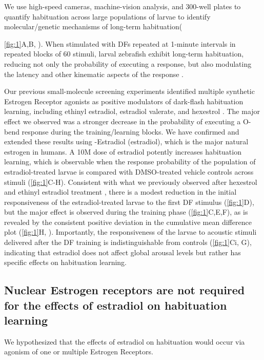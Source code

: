 \documentclass[9pt,lineno]{RandlettLab_elife}
\begin{document}
We use high-speed cameras, machine-vision analysis, and 300-well plates to quantify habituation across large populations of larvae to identify molecular/genetic mechanisms of long-term habituation({\autoref{fig:1}A,B, \citealp{Randlett2019-fj,Lamire2023-he}). 
When stimulated with DFs repeated at 1-minute intervals in repeated blocks of 60 stimuli, larval zebrafish exhibit long-term habituation, reducing not only the probability of executing a response, but also modulating the latency and other kinematic aspects of the response \citep{Randlett2019-fj}.  

Our previous small-molecule screening experiments identified multiple synthetic Estrogen Receptor agonists as positive modulators of dark-flash habituation learning, including ethinyl estradiol, estradiol valerate, and hexestrol  \citep{Lamire2023-he}. 
The major effect we observed was a stronger decrease in the probability of executing a O-bend response during the training/learning blocks. 
We have confirmed and extended these results using \textbeta-Estradiol (estradiol), which is the major natural estrogen in humans. 
A 10\textmu M dose of estradiol potently increases habituation learning, which is observable when the response probability of the population of estradiol-treated larvae is compared with DMSO-treated vehicle controls across stimuli (\autoref{fig:1}C-H).
Consistent with what we previously observed after hexestrol and ethinyl estradiol treatment \citep{Lamire2023-he}, there is a modest reduction in the initial responsiveness of the estradiol-treated larvae to the first DF stimulus (\autoref{fig:1}D), but the major effect is observed during the training phase (\autoref{fig:1}C,E,F), as is revealed by the consistent positive deviation in the cumulative mean difference plot (\autoref{fig:1}H, \citealp{Randlett2019-fj}).
Importantly, the responsiveness of the larvae to acoustic stimuli delivered after the DF training is indistinguishable from controls (\autoref{fig:1}Ci, G), indicating that estradiol does not affect global arousal levels but rather has specific effects on habituation learning. 


\subsection{Nuclear Estrogen receptors are not required for the effects of estradiol on habituation learning}

We hypothesized that the effects of estradiol on habituation would occur via agonism of one or multiple Estrogen Receptors.  


}
\end{document}
